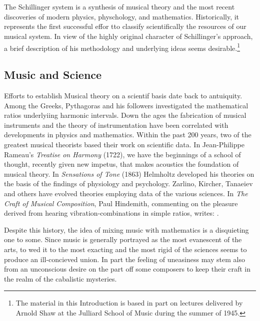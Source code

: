\chapter[\textit{Introduction} by Lyle Dowling]{}
The Schillinger system is a synthesis of musical theory and the most recent
discoveries of modern physics, physchology, and mathematics. Historically, it represents the first successful effor tto classify scientifically the resources of our musical system. In view of the highly original character of Schillinger's approach, a brief description of his methodology and underlying ideas seems desirable.\footnote{The material in this Introduction is based in part on lectures delivered by Arnold Shaw at the Julliard School of Music during the summer of 1945.}
\section{Music and Science}
Efforts to establish Musical theory on a scientif basis date back to
antuiquity. Among the Greeks, Pythagoras and his followers investigated the
mathematical ratios underlyiing harmonic intervals. Down the ages the
fabrication of musical instruments and the theory of instrumentation have been
correlated with developments in physics and mathematics. Within the past 200
years, two of the greatest musical theorists based their work on scientific
data. In Jean-Philippe Rameau's \textit{Treatise on Harmony} (1722), we have
the beginnings of a school of thought, recently given new impetus, that makes
acoustics the foundation of musical theory. In \textit{Sensations of Tone}
(1863) Helmholtz developed his theories on the basis of the findings of
physiology and psychology. Zarlino, Kircher, Tanaeiev and others have evolved
theories employing data of the various sciences. In \textit{The Craft of
Musical Composition}, Paul Hindemith, commenting on the pleasure derived from
hearing vibration-combinations in simple ratios, writes: .

Despite this history, the idea of mixing music with mathematics is a
disquieting one to some. Since music is generally portrayed as the most
evanescent of the arts, to wed it to the most exacting and the most rigid of
the sciences seems to produce an ill-concieved union. In part the feeling of
uneasiness may stem also from an unconscious desire on the part off some
composers to keep their craft in the realm of the cabalistic mysteries.

